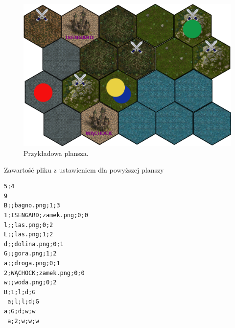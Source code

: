 \documentclass[a4paper, 11pt]{article}
\begin{document}
\begin{figure}[ht]

\centering

\includegraphics[scale=0.3]{plansza.png}

\caption{Przykładowa plansza.} 

\label{Klasy}

\end{figure}

Zawartość pliku z ustawieniem dla powyższej planszy
\begin{verbatim}
5;4
9
B;;bagno.png;1;3
1;ISENGARD;zamek.png;0;0
l;;las.png;0;2
L;;las.png;1;2
d;;dolina.png;0;1
G;;gora.png;1;2
a;;droga.png;0;1
2;WĄCHOCK;zamek.png;0;0
w;;woda.png;0;2
B;1;l;d;G
 a;l;l;d;G
a;G;d;w;w
 a;2;w;w;w	
\end{verbatim}
\end{document}
